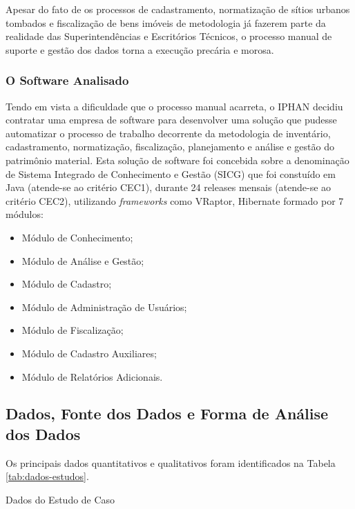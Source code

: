 Apesar do fato de os processos de cadastramento, normatização de sítios urbanos tombados e fiscalização de bens imóveis de metodologia já fazerem parte da realidade das Superintendências e Escritórios Técnicos, o processo manual de suporte e gestão dos dados torna a execução precária e morosa.



\subsubsection{O Software Analisado}
Tendo em vista a dificuldade que o processo manual acarreta, o IPHAN decidiu contratar uma empresa de software para desenvolver uma solução que pudesse automatizar o processo de trabalho decorrente da metodologia de inventário, cadastramento, normatização, fiscalização, planejamento e análise e gestão do patrimônio material. Esta solução de software foi concebida sobre a denominação de Sistema Integrado de Conhecimento e Gestão (SICG) que foi constuído em Java (atende-se ao critério CEC1), durante 24 releases mensais (atende-se ao critério CEC2), utilizando \textit{frameworks} como VRaptor, Hibernate formado por 7 módulos:

\begin{itemize}
\item Módulo de Conhecimento;
\item Módulo de Análise e Gestão;
\item Módulo de Cadastro;
\item Módulo de Administração de Usuários;
\item Módulo de Fiscalização;
\item Módulo de Cadastro Auxiliares;
\item Módulo de Relatórios Adicionais.
\end{itemize}


\subsection{Dados, Fonte dos Dados e Forma de Análise dos Dados}

Os principais dados quantitativos e qualitativos foram identificados na Tabela \ref{tab:dados-estudos}.

\begin{table}[H]
\begin{center}

\caption{Dados do Estudo de Caso}
\label{tab:dados-estudos}
\end{center}
\end{table}
\FloatBarrier

